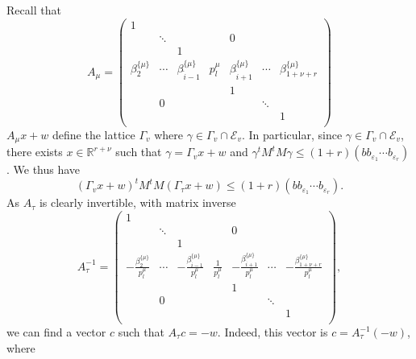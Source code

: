 Recall that 
\[A_{\mu}= \begin{pmatrix}
1	& 		&		&		&		&		&	\\
	& \ddots	& 		&		& 0		& 		&	\\
	&		& 1		&		&		&		&	\\
	\beta_2^{\{\mu\}}& \cdots & \beta_{\hat{i} - 1}^{\{\mu\}} & p_l^{\mu} & \beta_{\hat{i} + 1}^{\{\mu\}}& \cdots &\beta_{1+ \nu+ r}^{\{\mu\}}\\
	& 		& 		& 		& 1		&		&	\\	
	& 0		& 		& 		&		& \ddots	&	\\	
	& 		& 		& 		&		& 		& 1	\\	
\end{pmatrix}\]
$A_{\mu}x + w$ define the lattice $\Gamma_v$ where $\gamma\in \Gamma_v\cap \mathcal E_v$. In particular, since $\gamma\in \Gamma_v\cap \mathcal E_v$, there exists $x\in \mathbb{R}^{r + \nu}$ such that $\gamma=\Gamma_v x+w$ and ${\gamma^tM^tM\gamma\leq (1 + r)(bb_{\varepsilon_1}\cdots b_{\varepsilon_r})}$. We thus have
\[(\Gamma_v x+w)^tM^tM(\Gamma_\tau x+w) \leq (1 + r)(bb_{\varepsilon_1}\cdots b_{\varepsilon_r}).\]
As $A_{\tau}$ is clearly invertible, with matrix inverse
\[A_{\tau}^{-1} = \begin{pmatrix}
1	& 		&		&		&		&		&	\\
	& \ddots	& 		&		& 0		& 		&	\\
	&		& 1		&		&		&		&	\\
	-\frac{\beta_2^{\{\mu\}}}{p_l^{\mu}} & \cdots & -\frac{\beta_{\hat{i} - 1}^{\{\mu\}}}{p_l^{\mu}} & \frac{1}{p_l^{\mu}} & -\frac{\beta_{\hat{i} + 1}^{\{\mu\}}}{p_l^{\mu}}& \cdots &-\frac{\beta_{1+ \nu+ r}^{\{\mu\}}}{p_l^{\mu}}\\
	& 		& 		& 		& 1		&		&	\\	
	& 0		& 		& 		&		& \ddots	&	\\	
	& 		& 		& 		&		& 		& 1	\\
	\end{pmatrix},\]
we can find a vector $c$ such that $A_{\tau}c = -w$. Indeed, this vector is $c = A_{\tau}^{-1}(-w)$, where
